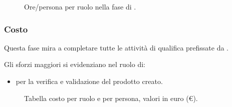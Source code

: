 \begin{figure}[H]
\caption{Ore/persona per ruolo nella fase di \VV.}
\label{fig:vv2}

\end{figure}

\subsubsection{Costo \VV}
\introcosto{\VV}
Questa fase mira a completare tutte le attività di qualifica prefissate da {\hx}.

Gli sforzi maggiori si evidenziano nel ruolo di:
\begin{itemize}
\item {\Vx} per la verifica e validazione del prodotto creato.
\end{itemize}

\begin{figure}[H]
\label{tab:vv}

  \caption{Tabella costo {\VV} per ruolo e per persona, valori in euro (\euro).}
\end{figure}

